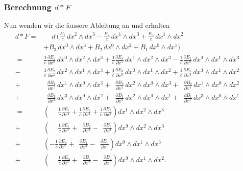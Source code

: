 \subsubsection{Berechnung $d {\ast} F$}
Nun wenden wir die äussere Ableitung an und erhalten
\begin{align*}
	d{\ast} F
	= &\phantom{+} d \, \Bigg(
	\frac{E_{1}}{c} \, dx^2 \wedge dx^3
	- \frac{E_{2}}{c} \, dx^1 \wedge dx^3
	+ \frac{E_{3}}{c} \, dx^1 \wedge dx^2 
	\\
	&+ B_3 \, dx^0 \wedge dx^3
	+ B_2 \, dx^0 \wedge dx^2
	+ B_1 \, dx^0 \wedge dx^1
	\Bigg) \\[1ex]
	= \phantom{+} &\frac{1}{c} \frac{\partial E_1}{\partial x^0} \, dx^0 \wedge dx^2 \wedge dx^3
	+ \frac{1}{c} \frac{\partial E_1}{\partial x^1} \, dx^1 \wedge dx^2 \wedge dx^3
	- \frac{1}{c} \frac{\partial E_2}{\partial x^0} \, dx^0 \wedge dx^1 \wedge dx^3 
	\\
	- &\frac{1}{c} \frac{\partial E_2}{\partial x^2} \, dx^2 \wedge dx^1 \wedge dx^3
	+ \frac{1}{c} \frac{\partial E_3}{\partial x^0} \, dx^0 \wedge dx^1 \wedge dx^2
	+ \frac{1}{c} \frac{\partial E_3}{\partial x^3} \, dx^3 \wedge dx^1 \wedge dx^2 
	\\
	+&\phantom{\frac{1}{c}} \frac{\partial B_3}{\partial x^1} \, dx^1 \wedge dx^0 \wedge dx^3
	+ \phantom{\frac{1}{c}} \frac{\partial B_3}{\partial x^2} \, dx^2 \wedge dx^0 \wedge dx^3
	+ \phantom{\frac{1}{c}} \frac{\partial B_2}{\partial x^1} \, dx^1 \wedge dx^0 \wedge dx^2 \\
	+&\phantom{\frac{1}{c}} \frac{\partial B_2}{\partial x^3} \, dx^3 \wedge dx^0 \wedge dx^2
	+ \phantom{\frac{1}{c}} \frac{\partial B_1}{\partial x^2} \, dx^2 \wedge dx^0 \wedge dx^1
	+ \phantom{\frac{1}{c}} \frac{\partial B_1}{\partial x^3} \, dx^3 \wedge dx^0 \wedge dx^1 
	\\[2ex]
	= \phantom{+} &\left(
	\phantom{+} \frac{1}{c} \frac{\partial E_1}{\partial x^1}
	+ \frac{1}{c} \frac{\partial E_2}{\partial x^2}
	+ \frac{1}{c} \frac{\partial E_3}{\partial x^3}
	\right) dx^1 \wedge dx^2 \wedge dx^3 
	\\
	+ &\left(
	\phantom{+} \frac{1}{c} \frac{\partial E_1}{\partial x^0}
	+ \phantom{\frac{1}{c}} \frac{\partial B_2}{\partial x^3}
	- \phantom{\frac{1}{c}} \frac{\partial B_3}{\partial x^2}
	\right) dx^0 \wedge dx^2 \wedge dx^3 
	\\
	+ &\left(
	-\frac{1}{c} \frac{\partial E_2}{\partial x^0}
	+ \phantom{\frac{1}{c}} \frac{\partial B_1}{\partial x^3}
	- \phantom{\frac{1}{c}} \frac{\partial B_3}{\partial x^1}
	\right) dx^0 \wedge dx^1 \wedge dx^3 
	\\
	+ &\left(
	\phantom{+} \frac{1}{c} \frac{\partial E_3}{\partial x^0}
	+ \phantom{\frac{1}{c}} \frac{\partial B_1}{\partial x^2}
	- \phantom{\frac{1}{c}} \frac{\partial B_2}{\partial x^1}
	\right) dx^0 \wedge dx^1 \wedge dx^2.
\end{align*}
